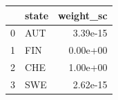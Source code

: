 \begin{tabular}{llr}
\toprule
 & state & weight_sc \\
\midrule
0 & AUT & 3.39e-15 \\
1 & FIN & 0.00e+00 \\
2 & CHE & 1.00e+00 \\
3 & SWE & 2.62e-15 \\
\bottomrule
\end{tabular}
